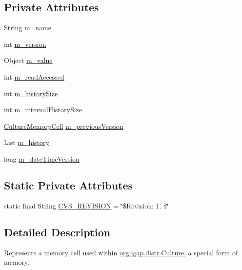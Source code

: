 \subsection*{Private Attributes}
\begin{DoxyCompactItemize}
\item 
String \hyperlink{classorg_1_1jgap_1_1distr_1_1_culture_memory_cell_ac2f8312562f240b39dc29c65a5cc803e}{m\-\_\-name}
\item 
int \hyperlink{classorg_1_1jgap_1_1distr_1_1_culture_memory_cell_af8363abf6c5aa7e2fb3c2aa10c8a8dc8}{m\-\_\-version}
\item 
Object \hyperlink{classorg_1_1jgap_1_1distr_1_1_culture_memory_cell_adbb7282e66ce0f1206eeb4cf8b00f9ea}{m\-\_\-value}
\item 
int \hyperlink{classorg_1_1jgap_1_1distr_1_1_culture_memory_cell_a0451820a22ed1617735b56d93972723e}{m\-\_\-read\-Accessed}
\item 
int \hyperlink{classorg_1_1jgap_1_1distr_1_1_culture_memory_cell_aafd1fe1c7f2065c1f9b8586b52709f08}{m\-\_\-history\-Size}
\item 
int \hyperlink{classorg_1_1jgap_1_1distr_1_1_culture_memory_cell_a70c0d54d68970a371d77cb59cbdba1a9}{m\-\_\-internal\-History\-Size}
\item 
\hyperlink{classorg_1_1jgap_1_1distr_1_1_culture_memory_cell}{Culture\-Memory\-Cell} \hyperlink{classorg_1_1jgap_1_1distr_1_1_culture_memory_cell_a55628ffd36f474c4ee323c4271d1d051}{m\-\_\-previous\-Version}
\item 
List \hyperlink{classorg_1_1jgap_1_1distr_1_1_culture_memory_cell_a414986e08e45655b20a1e8a550a1c7b0}{m\-\_\-history}
\item 
long \hyperlink{classorg_1_1jgap_1_1distr_1_1_culture_memory_cell_a26c0995799dbebc65f605a5b68cb8083}{m\-\_\-date\-Time\-Version}
\end{DoxyCompactItemize}
\subsection*{Static Private Attributes}
\begin{DoxyCompactItemize}
\item 
static final String \hyperlink{classorg_1_1jgap_1_1distr_1_1_culture_memory_cell_ab067ea6a1cf3e0d5f342ffa97a6576e9}{C\-V\-S\-\_\-\-R\-E\-V\-I\-S\-I\-O\-N} = \char`\"{}\$Revision\-: 1. \$\char`\"{}
\end{DoxyCompactItemize}


\subsection{Detailed Description}
Represents a memory cell used within \hyperlink{classorg_1_1jgap_1_1distr_1_1_culture}{org.\-jgap.\-distr.\-Culture}, a special form of memory. 

